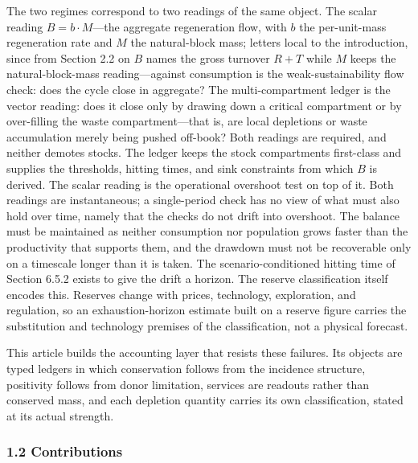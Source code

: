 \documentclass[11pt]{article}
\begin{document}
The two regimes correspond to two readings of the same object. The
scalar reading \(B = b\cdot M\)---the aggregate regeneration flow,
with \(b\) the per-unit-mass regeneration rate and \(M\) the
natural-block mass; letters local to the introduction, since from
Section 2.2 on \(B\) names the gross turnover \(R + T\) while \(M\)
keeps the natural-block-mass reading---against consumption is the
weak-sustainability flow check: does the cycle close in aggregate? The
multi-compartment ledger is the vector reading: does it close only by
drawing down a critical compartment or by over-filling the waste
compartment---that is, are local depletions or waste accumulation
merely being pushed off-book? Both readings are required, and neither
demotes stocks. The ledger keeps the stock compartments first-class and
supplies the thresholds, hitting times, and sink constraints from which
\(B\) is derived. The scalar reading is the operational overshoot test
on top of it. Both readings are instantaneous; a single-period check has
no view of what must also hold over time, namely that the checks do not
drift into overshoot. The balance must be maintained as neither
consumption nor population grows faster than the productivity that
supports them, and the drawdown must not be recoverable only on a
timescale longer than it is taken. The scenario-conditioned hitting time
of Section 6.5.2 exists to give the drift a horizon. The reserve
classification itself encodes this. Reserves change with prices,
technology, exploration, and regulation, so an exhaustion-horizon
estimate built on a reserve figure carries the substitution and
technology premises of the classification, not a physical forecast.

This article builds the accounting layer that resists these failures.
Its objects are typed ledgers in which conservation follows from the
incidence structure, positivity follows from donor limitation, services
are readouts rather than conserved mass, and each depletion quantity
carries its own classification, stated at its actual strength.

\subsubsection{1.2 Contributions}\label{contributions}
\end{document}
